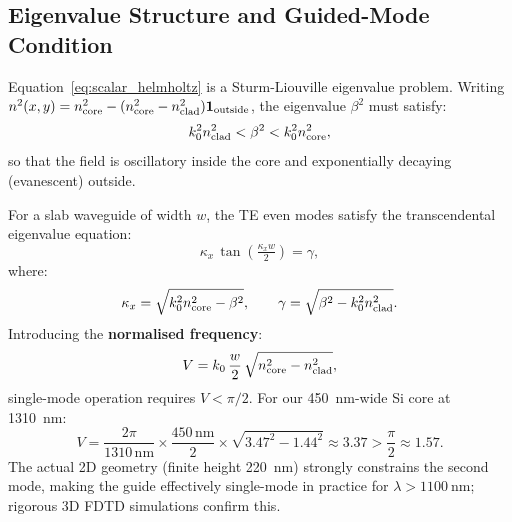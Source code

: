\documentclass[12pt, a4paper]{article}
\begin{document}
\subsection{Eigenvalue Structure and Guided-Mode Condition}

Equation~\eqref{eq:scalar_helmholtz} is a Sturm-Liouville eigenvalue problem.
Writing $n^2(x,y) = n_{\rm core}^2 - (n_{\rm core}^2 - n_{\rm clad}^2)
\mathbf{1}_{{\rm outside}}$, the eigenvalue $\beta^2$ must satisfy:
\begin{equation}
  k_0^2 n_{\rm clad}^2 < \beta^2 < k_0^2 n_{\rm core}^2,
  \label{eq:guidance_condition}
\end{equation}
so that the field is oscillatory inside the core and exponentially
decaying (evanescent) outside.

For a slab waveguide of width $w$, the TE even modes satisfy the
transcendental eigenvalue equation:
\begin{equation}
  \kappa_x\, \tan\!\left(\tfrac{\kappa_x w}{2}\right) = \gamma,
  \label{eq:eigen_TE}
\end{equation}
where:
\begin{equation}
  \kappa_x = \sqrt{k_0^2 n_{\rm core}^2 - \beta^2}, \qquad
  \gamma   = \sqrt{\beta^2 - k_0^2 n_{\rm clad}^2}.
  \label{eq:kappa_gamma}
\end{equation}
Introducing the \textbf{normalised frequency}:
\begin{equation}
  V = k_0\,\frac{w}{2}\,\sqrt{n_{\rm core}^2 - n_{\rm clad}^2},
  \label{eq:V_number}
\end{equation}
single-mode operation requires $V < \pi/2$.
For our \SI{450}{\nano\metre}-wide Si core at \SI{1310}{\nano\metre}:
\begin{equation}
  V = \frac{2\pi}{1310\,\mathrm{nm}}\times\frac{450\,\mathrm{nm}}{2}
  \times\sqrt{3.47^2 - 1.44^2} \approx 3.37 > \frac{\pi}{2} \approx 1.57.
\end{equation}
The actual 2D geometry (finite height \SI{220}{\nano\metre}) strongly
constrains the second mode, making the guide effectively single-mode
in practice for $\lambda > \SI{1100}{\nano\metre}$;
rigorous 3D FDTD simulations confirm this.
\end{document}
